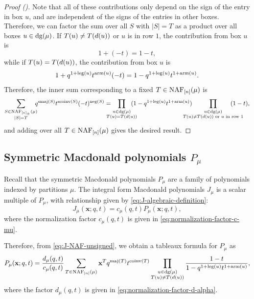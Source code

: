 \begin{proof}[Proof ({\cite[750]{HHL05}})]
	Note that all of these contributions only depend on the sign of the entry in box \(u\),
	and are independent of the signs of the entries in other boxes.
	Therefore, we can factor the sum over all \(S\) with \(|S| = T\) as a product over all boxes \(u \in \dg(\mu)\).
	If \(T(u) \neq T(d(u))\) or \(u\) is in row \(1\), the contribution from box \(u\) is
	\begin{equation*}
		1 + (-t) = 1 - t,
	\end{equation*}
	while if \(T(u) = T(d(u))\), the contribution from box \(u\) is
	\begin{equation*}
		1 + q^{1 + \operatorname{leg}(u)} t^{\operatorname{arm}(u)} (-t) = 1 - q^{1 + \operatorname{leg}(u)} t^{1 + \operatorname{arm}(u)}.
	\end{equation*}
	Therefore, the inner sum corresponding to a fixed \(T \in \NAF[\interval{n}](\mu)\) is
	\begin{equation*}
		\sum_{\substack{S \in {\NAF[\interval{n}_\pm](\mu)} \\ |S| = T}}
		\mkern -10mu
		q^{\operatorname{smaj}(S)} t^{\operatorname{scoinv}(S)} (-t)^{\operatorname{neg}(S)}
		=
		\mkern -18mu
		\prod_{\substack{u \in \dg(\mu) \\ T(u) = T(\south{u})}}
		\mkern -18mu
		(1 - q^{1 + \leg(u)} t^{1 + \arm(u)})
		\mkern -30mu
		\prod_{\substack{u \in \dg(\mu) \\ T(u) \neq T(\south{u}) \text{ or } u \text{ in row } 1}}
		\mkern -38mu
		(1 - t),
	\end{equation*}
	and adding over all \(T \in \NAF[\interval{n}](\mu)\) gives the desired result.
\end{proof}

\subsection{Symmetric Macdonald polynomials \texorpdfstring{\(P_\mu\)}{Pμ}}

Recall that the symmetric Macdonald polynomials \(P_\mu\) are a family of polynomials indexed by partitions \(\mu\).
The integral form Macdonald polynomials \(J_\mu\) is a scalar multiple of \(P_\mu\), with relationship given by \eqref{eq:J-algebraic-definition}:
\begin{equation*}
	J_\mu(\mathbf{x}; q, t)
	=
	c_\mu(q, t)
	P_\mu(\mathbf{x}; q, t),
\end{equation*}
where the normalization factor \(c_\mu(q, t)\) is given in \eqref{eq:normalization-factor-c-mu}.

Therefore, from \eqref{eq:J-NAF-unsigned}, we obtain a tableaux formula for \(P_\mu\) as
\begin{equation*}
	P_\mu(\mathbf{x}; q, t)
	=
	\frac{d_\mu(q, t)}{c_\mu(q, t)}
	\sum_{T \in \NAF[\interval{n}](\mu)} \mathbf{x}^T
	q^{\maj(T)} t^{\coinv(T)}
	\prod_{\substack{u \in \dg(\mu) \\ T(u) \neq T(\south{u})}}
	\frac{1 - t}{1 - q^{1 + \leg(u)} t^{1 + \arm(u)}},
\end{equation*}
where the factor \(d_\mu(q, t)\) is given in \eqref{eq:normalization-factor-d-alpha}.

